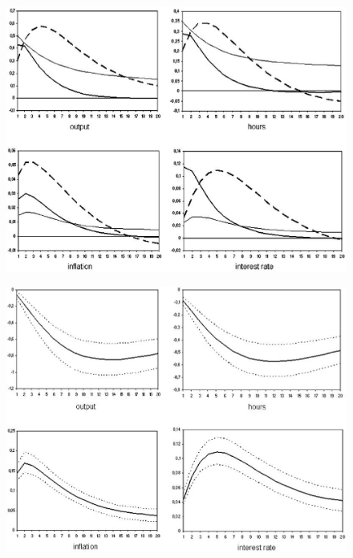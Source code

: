 \documentclass{beamer}
\begin{document}
\begin{frame}
  \begin{figure}
    \includegraphics[scale=.8]{sw_figure2.eps}
  \end{figure}
\end{frame}

\begin{frame}
  \begin{figure}
    \includegraphics[scale=.8]{sw_figure3.eps}
  \end{figure}
\end{frame}
\end{document}
